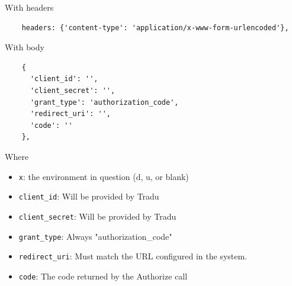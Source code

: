 \documentclass[11pt]{article}
\begin{document}
With headers

\begin{verbatim}
    headers: {'content-type': 'application/x-www-form-urlencoded'},
\end{verbatim}

With body

\begin{verbatim}
    {
      'client_id': '',
      'client_secret': '',
      'grant_type': 'authorization_code',
      'redirect_uri': '',
      'code': ''
    },
\end{verbatim}


Where

\begin{itemize}
    \item \verb|x|: the environment in question (d, u, or blank) 
    \item \verb|client_id|: Will be provided by Tradu
    \item \verb|client_secret|: Will be provided by Tradu
    \item \verb|grant_type|: Always "authorization\_code"
    \item \verb|redirect_uri|: Must match the URL configured in the system.
    \item \verb|code|: The code returned by the Authorize call

\end{itemize}
\end{document}
